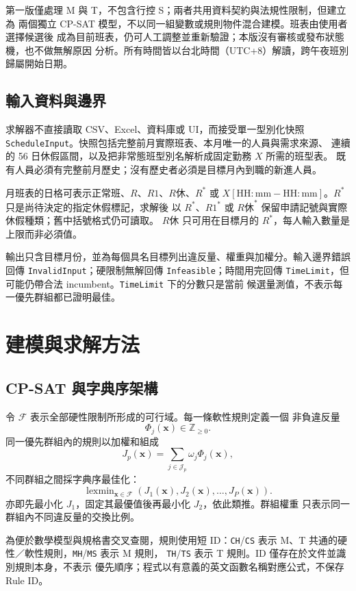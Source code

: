\documentclass[a4paper,12pt]{article}
\begin{document}
第一版僅處理 M 與 T，不包含行控 S；兩者共用資料契約與法規性限制，但建立為
兩個獨立 CP-SAT 模型，不以同一組變數或規則物件混合建模。班表由使用者選擇候選後
成為目前班表，仍可人工調整並重新驗證；本版沒有審核或發布狀態機，也不做無解原因
分析。所有時間皆以台北時間（UTC+8）解讀，跨午夜班別歸屬開始日期。

\subsection{輸入資料與邊界}

求解器不直接讀取 CSV、Excel、資料庫或 UI，而接受單一型別化快照
\texttt{ScheduleInput}。快照包括完整前月實際班表、本月唯一的人員與需求來源、
連續的 56 日休假區間，以及把非常態班型別名解析成固定勤務 \(X\) 所需的班型表。
既有人員必須有完整前月歷史；沒有歷史者必須是目標月內到職的新進人員。

月班表的日格可表示正常班、\(R\)、\(R1\)、\(R休\)、\(R^*\) 或
\(X[\mathrm{HH{:}mm-HH{:}mm}]\)。\(R^*\) 只是尚待決定的指定休假標記，求解後
以 \(R^*\)、\(R1^*\) 或 \(R休^*\) 保留申請記號與實際休假種類；舊中括號格式仍可讀取。
\(R休\) 只可用在目標月的 \(R^*\)，每人輸入數量是上限而非必須值。

輸出只含目標月份，並為每個具名目標列出違反量、權重與加權分。輸入邊界錯誤回傳
\texttt{InvalidInput}；硬限制無解回傳 \texttt{Infeasible}；時間用完回傳
\texttt{TimeLimit}，但可能仍帶合法 incumbent。\texttt{TimeLimit} 下的分數只是當前
候選量測值，不表示每一優先群組都已證明最佳。

\section{建模與求解方法}

\subsection{CP-SAT 與字典序架構}

令 \(\mathcal{F}\) 表示全部硬性限制所形成的可行域。每一條軟性規則定義一個
非負違反量
\[
  \Phi_j(\mathbf{x})\in\mathbb{Z}_{\geq0}.
\]
同一優先群組內的規則以加權和組成
\[
  J_p(\mathbf{x})
  =
  \sum_{j\in\mathcal{J}_p}\omega_j\Phi_j(\mathbf{x}),
\]
不同群組之間採字典序最佳化：
\[
  \operatorname{lexmin}_{\mathbf{x}\in\mathcal{F}}
  \left(J_1(\mathbf{x}),J_2(\mathbf{x}),\ldots,J_P(\mathbf{x})\right).
\]
亦即先最小化 \(J_1\)，固定其最優值後再最小化 \(J_2\)，依此類推。群組權重
只表示同一群組內不同違反量的交換比例。

為便於數學模型與規格書交叉查閱，規則使用短 ID：\texttt{CH}/\texttt{CS}
表示 M、T 共通的硬性／軟性規則，\texttt{MH}/\texttt{MS} 表示 M 規則，
\texttt{TH}/\texttt{TS} 表示 T 規則。ID 僅存在於文件並識別規則本身，不表示
優先順序；程式以有意義的英文函數名稱對應公式，不保存 Rule ID。
\end{document}
